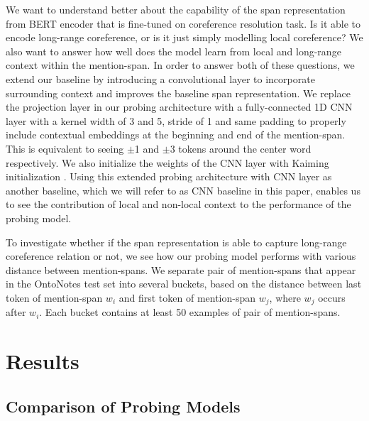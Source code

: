 \documentclass[11pt]{article}
\begin{document}
We want to understand better about the capability of the span representation from BERT encoder that is fine-tuned on coreference resolution task. Is it able to encode long-range coreference, or is it just simply modelling local coreference? We also want to answer how well does the model learn from local and long-range context within the mention-span. In order to answer both of these questions, we extend our baseline by introducing a convolutional layer to incorporate surrounding context and improves the baseline span representation. We replace the projection layer in our probing architecture with a fully-connected 1D CNN layer with a kernel width of 3 and 5, stride of 1 and same padding to properly include contextual embeddings at the beginning and end of the mention-span. This is equivalent to seeing $\pm$1 and $\pm$3 tokens around the center word respectively. We also initialize the weights of the CNN layer with Kaiming initialization \parencite{kaiming}. Using this extended probing architecture with CNN layer as another baseline, which we will refer to as CNN baseline in this paper, enables us to see the contribution of local and non-local context to the performance of the probing model. 

To investigate whether if the span representation is able to capture long-range coreference relation or not, we see how our probing model performs with various distance between mention-spans. We separate pair of mention-spans that appear in the OntoNotes test set into several buckets, based on the distance between last token of mention-span $w_{i}$ and first token of mention-span $w_{j}$, where $w_{j}$ occurs after $w_{i}$. Each bucket contains at least 50 examples of pair of mention-spans. 








\section{Results}
\subsection{Comparison of Probing Models}
\end{document}
